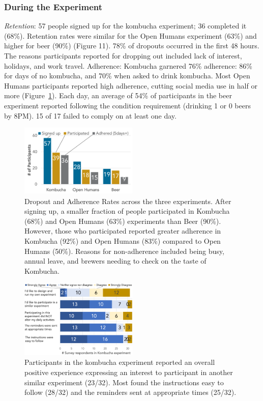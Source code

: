\subsubsection{During the Experiment}
\textit{Retention}: 57 people signed up for the kombucha experiment; 36 completed it (68\%). Retention rates were similar for the Open Humans experiment (63\%) and higher for beer (90\%) (Figure 11). 78\% of dropouts occurred in the first 48 hours. The reasons participants reported for dropping out included lack of interest, holidays, and work travel.
Adherence: Kombucha garnered 76\% adherence: 86\% for days of no kombucha, and 70\% when asked to drink kombucha. Most Open Humans participants reported high adherence, cutting social media use in half or more (Figure~\ref{fig:galileo-result3-1}). Each day, an average of 54\% of participants in the beer experiment reported following the condition requirement (drinking 1 or 0 beers by 8PM). 15 of 17 failed to comply on at least one day.

\begin{figure}[h] 
\centering
  \includegraphics[width=0.5\textwidth]{figures/galileo/galileo-study3-1}
  \caption[Dropout and Adherence Rates across the three experiments]
{Dropout and Adherence Rates across the three experiments. After signing up, a smaller fraction of people participated in Kombucha (68\%) and Open Humans (63\%) experiments than Beer (90\%). However, those who participated reported greater adherence in Kombucha (92\%) and Open Humans (83\%) compared to Open Humans (50\%). Reasons for non-adherence included being busy, annual leave, and brewers needing to check on the taste of Kombucha. }
  \label{fig:galileo-result3-1}
\end{figure}

\begin{figure}[h] 
\centering
  \includegraphics[width=0.5\textwidth]{figures/galileo/galileo-study3-2}
  \caption[Participants in the kombucha experiment reported an overall positive experience]
{Participants in the kombucha experiment reported an overall positive experience expressing an interest to participant in another similar experiment (23/32). Most found the instructions easy to follow (28/32) and the reminders sent at appropriate times (25/32). }
  \label{fig:galileo-result3-2}
\end{figure}

